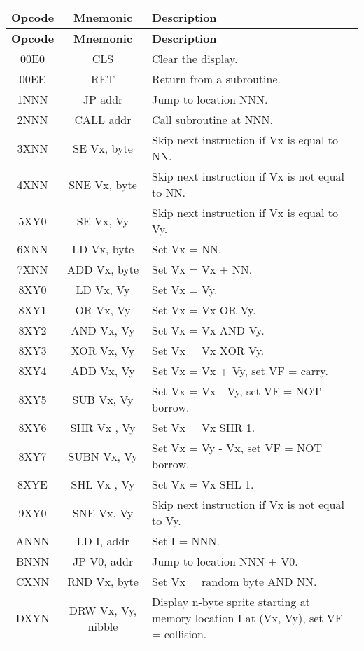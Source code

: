 \begin{longtable}{|c|c|p{9cm}|}
\hline
\textbf{Opcode} & \textbf{Mnemonic} & \textbf{Description} \\
\hline
\endfirsthead

\hline
\textbf{Opcode} & \textbf{Mnemonic} & \textbf{Description} \\
\hline
\endhead

\hline
\endfoot

\hline
\endlastfoot

00E0 & CLS & Clear the display. \\
00EE & RET & Return from a subroutine. \\
1NNN & JP addr & Jump to location NNN. \\
2NNN & CALL addr & Call subroutine at NNN. \\
3XNN & SE Vx, byte & Skip next instruction if Vx is equal to NN. \\
4XNN & SNE Vx, byte & Skip next instruction if Vx is not equal to NN. \\
5XY0 & SE Vx, Vy & Skip next instruction if Vx is equal to Vy. \\
6XNN & LD Vx, byte & Set Vx = NN. \\
7XNN & ADD Vx, byte & Set Vx = Vx + NN. \\
8XY0 & LD Vx, Vy & Set Vx = Vy. \\
8XY1 & OR Vx, Vy & Set Vx = Vx OR Vy. \\
8XY2 & AND Vx, Vy & Set Vx = Vx AND Vy. \\
8XY3 & XOR Vx, Vy & Set Vx = Vx XOR Vy. \\
8XY4 & ADD Vx, Vy & Set Vx = Vx + Vy, set VF = carry. \\
8XY5 & SUB Vx, Vy & Set Vx = Vx - Vy, set VF = NOT borrow. \\
8XY6 & SHR Vx {, Vy} & Set Vx = Vx SHR 1. \\
8XY7 & SUBN Vx, Vy & Set Vx = Vy - Vx, set VF = NOT borrow. \\
8XYE & SHL Vx {, Vy} & Set Vx = Vx SHL 1. \\
9XY0 & SNE Vx, Vy & Skip next instruction if Vx is not equal to Vy. \\
ANNN & LD I, addr & Set I = NNN. \\
BNNN & JP V0, addr & Jump to location NNN + V0. \\
CXNN & RND Vx, byte & Set Vx = random byte AND NN. \\
DXYN & DRW Vx, Vy, nibble & Display n-byte sprite starting at memory location I at (Vx, Vy), set VF = collision. \\

\end{longtable}

